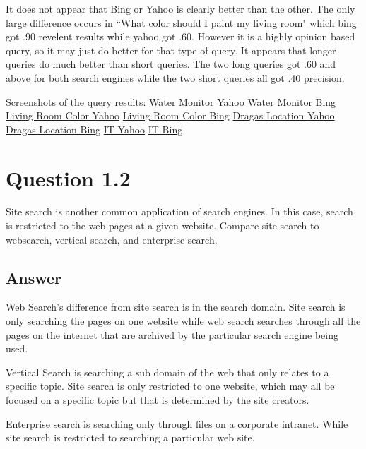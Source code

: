\documentclass{article}
\begin{document}
It does not appear that Bing or Yahoo is clearly better than the other. The only large difference occurs in ``What color should I paint my living room" which bing 
got .90 revelent results while yahoo got .60. However it is a highly opinion based query, so it may just do better for that type of query. It appears that
longer queries do much better than short queries. The two long queries got .60 and above for both search engines while the two short queries all got .40 precision. 

Screenshots of the query results: 
\href{https://github.com/Miranda-C-Smith/cs834-f17/tree/master/assignments}{Water Monitor Yahoo}
\href{https://github.com/Miranda-C-Smith/cs834-f17/tree/master/assignments}{Water Monitor Bing}
\href{https://github.com/Miranda-C-Smith/cs834-f17/tree/master/assignments}{Living Room Color Yahoo}
\href{https://github.com/Miranda-C-Smith/cs834-f17/tree/master/assignments}{Living Room Color Bing}
\href{https://github.com/Miranda-C-Smith/cs834-f17/tree/master/assignments}{Dragas Location Yahoo}
\href{https://github.com/Miranda-C-Smith/cs834-f17/tree/master/assignments}{Dragas Location Bing}
\href{https://github.com/Miranda-C-Smith/cs834-f17/tree/master/assignments}{IT Yahoo}
\href{https://github.com/Miranda-C-Smith/cs834-f17/tree/master/assignments}{IT Bing}


\section{Question 1.2}

Site search is another common application of search engines. In this case, search is restricted to the web pages at a given website. Compare site search to websearch, vertical search, and enterprise search. 

\subsection*{Answer}

Web Search's difference from site search is in the search domain. Site search is only searching the pages on one website while web search searches through all the pages on the internet that are archived by the particular search engine being used.
\par
Vertical Search is searching a sub domain of the web that only relates to a specific topic. Site search is only restricted to one website, which may all be focused on a specific topic but that is determined by the site creators.
\par
Enterprise search is searching only through files on a corporate intranet. While site search is restricted to searching a particular web site.
\end{document}
